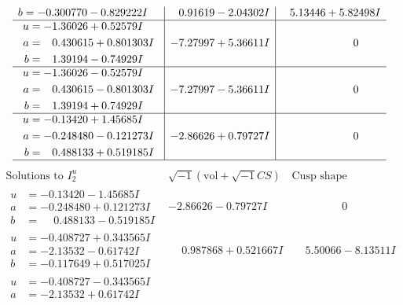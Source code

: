 \documentclass[1p]{elsarticle_modified}
\theoremstyle{definition}
\newcommand{\I}{\sqrt{-1}}
\begin{document}
$$\begin{array}{c|c|c}
\begin{aligned}
b &= -0.300770 - 0.829222 I\end{aligned}
 & \phantom{-}0.91619 - 2.04302 I & \phantom{-}5.13446 + 5.82498 I \\ \hline\begin{aligned}
u &= -1.36026 + 0.52579 I \\
a &= \phantom{-}0.430615 + 0.801303 I \\
b &= \phantom{-}1.39194 - 0.74929 I\end{aligned}
 & -7.27997 + 5.36611 I & \phantom{-0.000000 } 0 \\ \hline\begin{aligned}
u &= -1.36026 - 0.52579 I \\
a &= \phantom{-}0.430615 - 0.801303 I \\
b &= \phantom{-}1.39194 + 0.74929 I\end{aligned}
 & -7.27997 - 5.36611 I & \phantom{-0.000000 } 0 \\ \hline\begin{aligned}
u &= -0.13420 + 1.45685 I \\
a &= -0.248480 - 0.121273 I \\
b &= \phantom{-}0.488133 + 0.519185 I\end{aligned}
 & -2.86626 + 0.79727 I & \phantom{-0.000000 } 0\\
 \hline 
 \end{array}$$\newpage$$\begin{array}{c|c|c}  
\text{Solutions to }I^u_{2}& \I (\text{vol} + \sqrt{-1}CS) & \text{Cusp shape}\\
 \hline 
\begin{aligned}
u &= -0.13420 - 1.45685 I \\
a &= -0.248480 + 0.121273 I \\
b &= \phantom{-}0.488133 - 0.519185 I\end{aligned}
 & -2.86626 - 0.79727 I & \phantom{-0.000000 } 0 \\ \hline\begin{aligned}
u &= -0.408727 + 0.343565 I \\
a &= -2.13532 - 0.61742 I \\
b &= -0.117649 + 0.517025 I\end{aligned}
 & \phantom{-}0.987868 + 0.521667 I & \phantom{-}5.50066 - 8.13511 I \\ \hline\begin{aligned}
u &= -0.408727 - 0.343565 I \\
a &= -2.13532 + 0.61742 I \\

\end{aligned}
\end{array}$$
\end{document}
